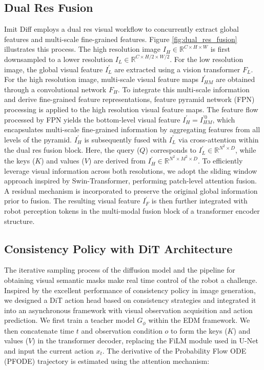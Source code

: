 \subsection{Dual Res Fusion}
\label{Dual Res Fusion}
Imit Diff employs a dual res visual workflow to concurrently extract global features and multi-scale fine-grained features. Figure \ref{fig:dual_res_fusion} illustrates this process. The high resolution image $
I_H \in \mathbb{R}^{C \times H \times W}$ is first downsampled to a lower resolution $I_L \in \mathbb{R}^{C \times H/2 \times W/2}$. For the low resolution image, the global visual feature $I_{L}^{'}$ are extracted using a vision transformer $F_{L}$. For the high resolution image, multi-scale visual feature maps $I_{HM}^{'}$ are obtained through a convolutional network $F_{H}$. To integrate this multi-scale information and derive fine-grained feature representations, feature pyramid network (FPN) processing is applied to the high resolution visual feature maps. The feature flow processed by FPN yields the bottom-level visual feature $I_{H}^{'}=I_{HM}^{'0}$, which encapsulates multi-scale fine-grained information by aggregating features from all levels of the pyramid. $I_{H}^{'}$ is subsequently fused with $I_{L}^{'}$ via cross-attention within the dual res fusion block. Here, the query ($Q$) corresponds to $I_{L}^{'} \in \mathbb{R}^{N^{2} \times D}$, while the keys ($K$) and values ($V$) are derived from $I_{H}^{'} \in \mathbb{R}^{N^{2} \times M^{2} \times D}$. To efficiently leverage visual information across both resolutions, we adopt the sliding window approach inspired by Swin-Transformer, performing patch-level attention fusion. A residual mechanism is incorporated to preserve the original global information prior to fusion. The resulting visual feature $I_{F}^{'}$ is then further integrated with robot perception tokens in the multi-modal fusion block of a transformer encoder structure.



\subsection{Consistency Policy with DiT Architecture}
\label{Consistency Policy with DiT Architecture}
The iterative sampling process of the diffusion model and the pipeline for obtaining visual semantic masks make real time control of the robot a challenge. Inspired by the excellent performance of consistency policy in image generation, we designed a DiT action head based on consistency strategies and integrated it into an asynchronous framework with visual observation acquisition and action prediction. We first train a teacher model $G_{\phi}$ within the EDM framework. We then concatenate time $t$ and observation condition $o$ to form the keys ($K$) and values ($V$) in the transformer decoder, replacing the FiLM module used in U-Net and input the current action $x_t$. The derivative of the Probability Flow ODE (PFODE) trajectory is estimated using the attention mechanism:

